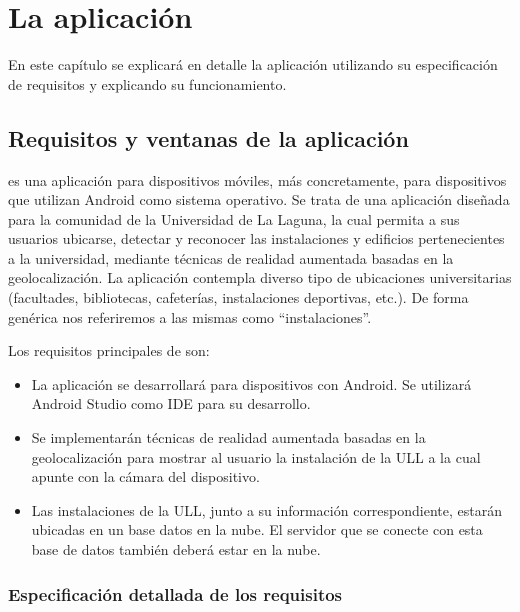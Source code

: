
%
%
%

\chapter{La aplicación \ULLAR{}} \label{chap:LaAplicacion} 

En este capítulo se explicará en detalle la aplicación \ULLAR{} utilizando su especificación de requisitos y explicando su funcionamiento.

\section{Requisitos y ventanas de la aplicación} %

\ULLAR{} es una aplicación para dispositivos móviles, más concretamente, para dispositivos que utilizan Android como sistema operativo. Se trata de una aplicación diseñada para la comunidad de la Universidad de La Laguna, la cual permita a sus usuarios ubicarse, detectar y reconocer las instalaciones y edificios pertenecientes a la universidad, mediante técnicas de realidad aumentada basadas en la geolocalización.
La aplicación contempla diverso tipo de ubicaciones universitarias (facultades, bibliotecas, cafeterías, instalaciones deportivas, etc.). De forma genérica nos referiremos a las mismas como ``instalaciones''.

Los requisitos principales de \ULLAR{} son:
\begin{itemize}
    \item La aplicación se desarrollará para dispositivos con Android. Se utilizará Android Studio como IDE para su desarrollo.
    \item Se implementarán técnicas de realidad aumentada basadas en la geolocalización para mostrar al usuario la instalación de la ULL a la cual apunte con la cámara del dispositivo.
    \item Las instalaciones de la ULL, junto a su información correspondiente, estarán ubicadas en un base datos en la nube. El servidor que se conecte con esta base de datos también deberá estar en la nube.
\end{itemize}

\subsection{Especificación detallada de los requisitos} 

